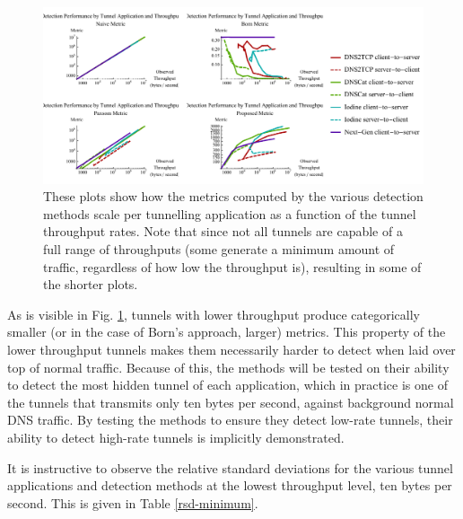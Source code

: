 \documentclass{llncs}
\begin{document}
\begin{figure}
\centering
\includegraphics[width=\textwidth]{../figures/mpbtt.pdf}
\caption[Scaling of Detection Metrics by Tunnel Throughput]{These plots show how
the metrics computed by the various detection methods scale per tunnelling
application as a function of the tunnel throughput rates. Note that since not
all tunnels are capable of a full range of throughputs (some generate a minimum
amount of traffic, regardless of how low the throughput is), resulting in some
of the shorter plots.}
\label{mbtt}
\end{figure}

As is visible in Fig. \ref{mbtt}, tunnels with lower throughput produce
categorically smaller (or in the case of Born's approach, larger) metrics. This
property of the lower throughput tunnels makes them necessarily harder to detect
when laid over top of normal traffic. Because of this, the methods will be
tested on their ability to detect the most hidden tunnel of each application,
which in practice is one of the tunnels that transmits only ten bytes per
second, against background normal DNS traffic. By testing
the methods to ensure they detect low-rate tunnels, their ability to detect
high-rate tunnels is implicitly demonstrated.

It is instructive to observe the relative standard deviations for the various
tunnel applications and detection methods at the lowest throughput level, ten
bytes per second. This is given in Table \ref{rsd-minimum}.

\end{document}
